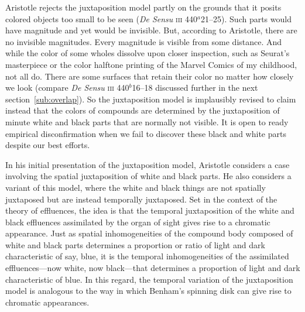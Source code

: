 Aristotle rejects the juxtaposition model partly on the grounds that it posits colored objects too small to be seen (\emph{De Sensu} \textsc{iii} 440\( ^{a} \)21--25). Such parts would have magnitude and yet would be invisible. But, according to Aristotle, there are no invisible magnitudes. Every magnitude is visible from some distance. And while the color of some wholes dissolve upon closer inspection, such as Seurat's masterpiece or the color halftone printing of the Marvel Comics of my childhood, not all do. There are some surfaces that retain their color no matter how closely we look (compare \emph{De Sensu} \textsc{iii} 440\( ^{b} \)16--18 discussed further in the next section~\ref{sub:overlap}). So the juxtaposition model is implausibly revised to claim instead that the colors of compounds are determined by the juxtaposition of minute white and black parts that are normally not visible. It is open to ready empirical disconfirmation when we fail to discover these black and white parts despite our best efforts.

In his initial presentation of the juxtaposition model, Aristotle considers a case involving the spatial juxtaposition of white and black parts. He also considers a variant of this model, where the white and black things are not spatially juxtaposed but are instead temporally juxtaposed. Set in the context of the theory of effluences, the idea is that the temporal juxtaposition of the white and black effluences assimilated by the organ of sight gives rise to a chromatic appearance. Just as spatial inhomogeneities of the compound body composed of white and black parts determines a proportion or ratio of light and dark characteristic of say, blue, it is the temporal inhomogeneities of the assimilated effluences---now white, now black---that determines a proportion of light and dark characteristic of blue. In this regard, the temporal variation of the juxtaposition model is analogous to the way in which Benham's spinning disk can give rise to chromatic appearances.

